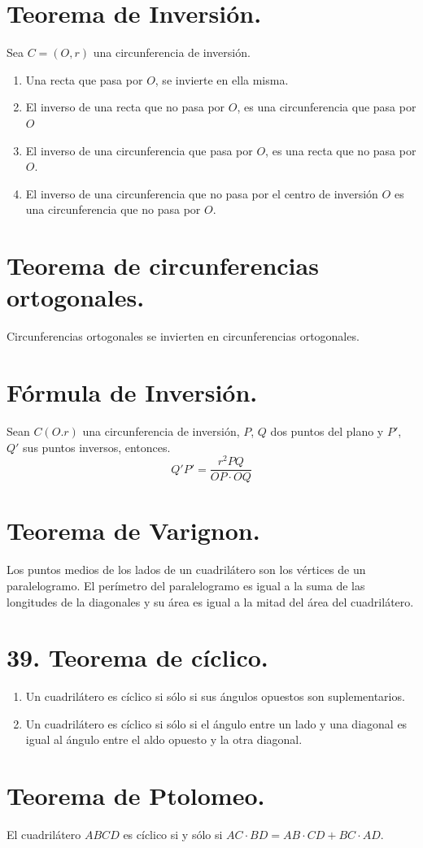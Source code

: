 \documentclass[12pt,a4paper]{book}
\begin{document}
\section{Teorema de Inversión.}
Sea $C=(O, r)$ una circunferencia de inversión. 
\begin{enumerate}
\item Una recta que pasa por $O$, se invierte en ella misma.
\item El inverso de una recta que no pasa por $O$, es una circunferencia que pasa por $O$
\item El inverso de una circunferencia que pasa por $O$, es una recta que no pasa por $O$.
\item El inverso de una circunferencia que no pasa por el centro de inversión $O$ es una circunferencia que no pasa por $O$.
\end{enumerate}
\section{Teorema de circunferencias  ortogonales.}
Circunferencias ortogonales se invierten en circunferencias ortogonales.
\section{Fórmula de Inversión.}
Sean $C(O. r)$ una circunferencia de inversión, $P$, $Q$ dos puntos del plano y $P'$, $Q'$ sus puntos inversos, entonces.$$Q'P'= \dfrac{r^2PQ}{OP \cdot OQ}$$
\section{Teorema de Varignon.}
Los puntos medios de los lados de un cuadrilátero son los vértices de un paralelogramo. El perímetro del paralelogramo es igual a la suma de las longitudes de la diagonales y su área es igual a la mitad del área del cuadrilátero. 
\section{39. Teorema de cíclico.}
\begin{enumerate}
\item Un cuadrilátero es cíclico si sólo si sus ángulos opuestos son suplementarios.
\item Un cuadrilátero es cíclico si sólo si el ángulo entre un lado y una diagonal es igual al ángulo entre el aldo opuesto y la otra diagonal.
\end{enumerate}
\section{Teorema de Ptolomeo.}
El cuadrilátero $ABCD$ es cíclico si y sólo si $AC \cdot BD = AB \cdot CD + BC \cdot AD$.
\end{document}
